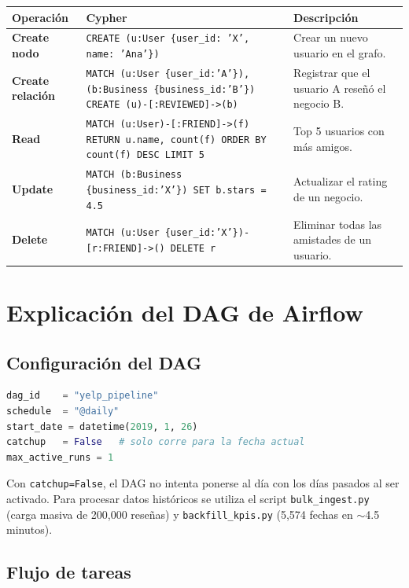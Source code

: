 \documentclass[12pt,a4paper]{article}
\begin{document}
\begin{longtable}{>{\bfseries}p{2.2cm} p{5.2cm} p{5.8cm}}
\toprule
Operación & Cypher & Descripción \\
\midrule
Create nodo &
\texttt{CREATE (u:User \{user\_id: 'X', name: 'Ana'\})} &
Crear un nuevo usuario en el grafo. \\

Create relación &
\texttt{MATCH (u:User \{user\_id:'A'\}), (b:Business \{business\_id:'B'\}) CREATE (u)-[:REVIEWED]->(b)} &
Registrar que el usuario A reseñó el negocio B. \\

Read &
\texttt{MATCH (u:User)-[:FRIEND]->(f) RETURN u.name, count(f) ORDER BY count(f) DESC LIMIT 5} &
Top 5 usuarios con más amigos. \\

Update &
\texttt{MATCH (b:Business \{business\_id:'X'\}) SET b.stars = 4.5} &
Actualizar el rating de un negocio. \\

Delete &
\texttt{MATCH (u:User \{user\_id:'X'\})-[r:FRIEND]->() DELETE r} &
Eliminar todas las amistades de un usuario. \\
\bottomrule
\end{longtable}

\section{Explicación del DAG de Airflow}

\subsection{Configuración del DAG}

\begin{lstlisting}[language=Python]
dag_id    = "yelp_pipeline"
schedule  = "@daily"
start_date = datetime(2019, 1, 26)
catchup   = False   # solo corre para la fecha actual
max_active_runs = 1
\end{lstlisting}

Con \texttt{catchup=False}, el DAG no intenta ponerse al día con los días pasados al ser
activado. Para procesar datos históricos se utiliza el script \texttt{bulk\_ingest.py}
(carga masiva de 200,000 reseñas) y \texttt{backfill\_kpis.py} (5,574 fechas en $\sim$4.5 minutos).

\subsection{Flujo de tareas}
\end{document}
